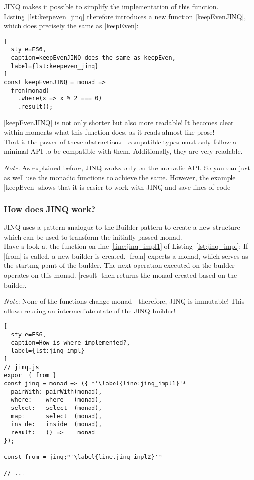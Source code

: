 JINQ makes it possible to simplify the implementation of this function.
Listing~\ref{lst:keepeven_jinq} therefore introduces a new function
|keepEvenJINQ|, which does precisely the same as |keepEven|:

\begin{lstlisting}[
  style=ES6,
  caption=keepEvenJINQ does the same as keepEven,
  label={lst:keepeven_jinq}
]
const keepEvenJINQ = monad =>
  from(monad)
    .where(x => x % 2 === 0)
    .result();
\end{lstlisting}

|keepEvenJINQ| is not only shorter but also more readable! It becomes clear
within moments what this function does, as it reads almost like prose!\\
That is the power of these abstractions - compatible types must only follow a
minimal API to be compatible with them. Additionally, they are very readable.

\textit{Note}: As explained before, JINQ works only on the monadic API. So you
can just as well use the monadic functions to achieve the same. However, the
example |keepEven| shows that it is easier to work with JINQ and save lines of
code.

\subsubsection{How does JINQ work?} %
\label{sec:How does JINQ work?}
JINQ uses a pattern analogue to the Builder pattern
\cite[Chapter~3.2]{gang_of_four_depa} to create a new structure which can be
used to transform the initially passed monad. \\
Have a look at the function on line~\ref{line:jinq_impl1} of
Listing~\ref{lst:jinq_impl}: If |from| is called, a new builder is created.
|from| expects a monad, which serves as the starting point of the builder. The
next operation executed on the builder operates on this monad. |result| then
returns the monad created based on the builder.

\textit{Note}: None of the functions change monad - therefore, JINQ is
immutable! This allows reusing an intermediate state of the JINQ builder!

\begin{lstlisting}[
  style=ES6,
  caption=How is where implemented?,
  label={lst:jinq_impl}
]
// jinq.js
export { from }
const jinq = monad => ({ *'\label{line:jinq_impl1}'*
  pairWith: pairWith(monad),
  where:    where   (monad),
  select:   select  (monad),
  map:      select  (monad),
  inside:   inside  (monad),
  result:   () =>    monad
});

const from = jinq;*'\label{line:jinq_impl2}'*

// ...
\end{lstlisting}

